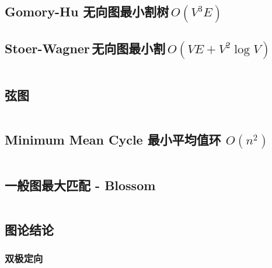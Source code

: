 \documentclass[titlepage, a4paper, 11pt]{article}
\begin{document}
\begin{spacing}{1.15}
				\subsection{Gomory-Hu 无向图最小割树\,$O(V ^ 3 E)$}
					
				\subsection{Stoer-Wagner\,无向图最小割\,$O(VE + V ^ 2 \log V)$}
					\inputminted{cpp}{src/yzh/Stoer-Wagner.cpp}
				\subsection{弦图}
					
					\inputminted{cpp}{src/TreeandGraph/弦图.cpp}
				\subsection{Minimum Mean Cycle 最小平均值环 $O(n^2)$}
					\inputminted{cpp}{src/TreeandGraph/MeanCycle.cpp}
				\subsection{一般图最大匹配 - Blossom}
					\inputminted{cpp}{src/TreeandGraph/Blossom.cpp}
				\subsection{图论结论}
					
					
					
					
					
					
					\subsubsection{双极定向}
					\inputminted{cpp}{src/tbr/bipolar_orientation.cpp}
					


\end{spacing}
\end{document}
